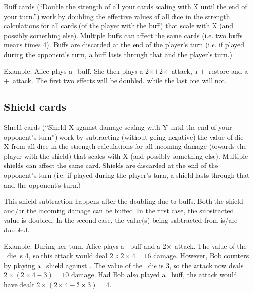\documentclass[dvipsnames,parskip,a4paper]{scrartcl}
\newcommand{\iconsize}{3.4mm}
\newcommand{\icondepth}{0.45mm}
\newcommand{\icon}[1]{\raisebox{-\icondepth}{\texttt{[image:  \#1 ]}}}
\newcommand{\fire}{\icon{icons/fire.png}}
\newcommand{\earth}{\icon{icons/earth.png}}
\newcommand{\water}{\icon{icons/water.png}}
\newcommand{\nature}{\icon{icons/nature.png}}
\newcommand{\magic}{\icon{icons/magic.png}}
\begin{document}
Buff cards (``Double the strength of all your cards scaling with X until the end of your turn.'') work by doubling the effective values of all dice in the strength calculations for all cards (of the player with the buff) that scale with X (and possibly something else). Multiple buffs can affect the same cards (i.e. two buffs means times 4). Buffs are discarded at the end of the player's turn (i.e. if played during the opponent's turn, a buff lasts through that and the player's turn.)

\vspace{4pt}

Example: Alice plays a \fire \ buff. She then plays a 2\hspace{1pt}$\times$\fire\hspace{1pt}$+$\hspace{1pt}2\hspace{1pt}$\times$\magic \ attack, a \nature\hspace{1pt}$+$\hspace{1pt}\fire \ restore and a \water\hspace{1pt}$+$\hspace{1pt}\earth \ attack. The first two effects will be doubled, while the last one will not.

\subsection*{Shield cards}

Shield cards (``Shield X against damage scaling with Y until the end of your opponent's turn'') work by subtracting (without going negative) the value of die X from all dice in the strength calculations for all incoming damage (towards the player with the shield) that scales with X (and possibly something else). Multiple shields can affect the same card. Shields are discarded at the end of the opponent's turn (i.e. if played during the player's turn, a shield lasts through that and the opponent's turn.)

\vspace{4pt}

This shield subtraction happens after the doubling due to buffs. Both the shield and/or the incoming damage can be buffed. In the first case, the substracted value is doubled. In the second case, the value(s) being subtracted from is/are doubled.

\vspace{4pt}

Example: During her turn, Alice plays a \fire \ buff and a 2\hspace{1pt}$\times$\hspace{1pt}\fire \ attack. The value of the \fire \ die is 4, so this attack would deal $2 \times 2 \times 4 = 16$ damage. However, Bob counters by playing a \water \ shield against \fire. The value of the \water \ die is 3, so the attack now deals $2 \times (2 \times 4 - 3) = 10$ damage. Had Bob also played a \water \ buff, the attack would have dealt $2 \times (2 \times 4 - 2 \times 3) = 4$.
\end{document}

